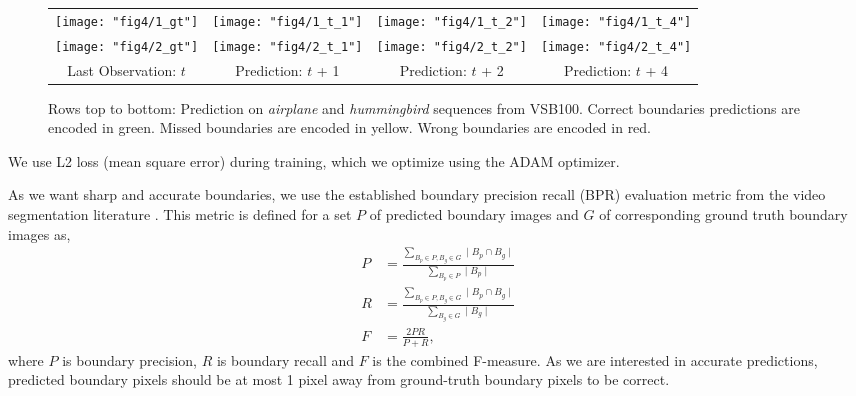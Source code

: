 \begin{figure*}[t]
  
  \centering
  \begin{tabular}{ cccc }
     
    \texttt{[image: "fig4/1\_gt"]} &
    \texttt{[image: "fig4/1\_t\_1"]} &
    \texttt{[image: "fig4/1\_t\_2"]} &
    \texttt{[image: "fig4/1\_t\_4"]} \\
     \addlinespace[-3.4ex]
    \texttt{[image: "fig4/2\_gt"]}&
    \texttt{[image: "fig4/2\_t\_1"]}&
    \texttt{[image: "fig4/2\_t\_2"]}&
    \texttt{[image: "fig4/2\_t\_4"]}\\
    
    Last Observation: $t$ & Prediction: $t$ + 1 & Prediction: $t$ + 2 &  Prediction: $t$ + 4 \\
    
    \end{tabular}
  \caption{Rows top to bottom: Prediction on \emph{airplane} and \emph{hummingbird} sequences from VSB100. Correct boundaries predictions are encoded in green. Missed boundaries are encoded in yellow. Wrong boundaries are encoded in red.}
  \label{fig:cframes}
\end{figure*}

 We use L2 loss (mean square error) during training, which we optimize using the ADAM optimizer. 

 As we want sharp and accurate boundaries, we use the established boundary precision recall (BPR) evaluation metric from the video segmentation literature \cite{galasso2013unified}. This metric is defined for a set $P$ of predicted boundary images and $G$ of corresponding ground truth boundary images as,
%
\begin{align*}
    P &= \frac{ \sum_{B_{p} \in P, B_{g} \in G} \mid B_{p} \cap B_{g} \mid }{\sum_{B_{p} \in P} \mid B_{p} \mid}\\
    R &= \frac{ \sum_{B_{p} \in P, B_{g} \in G} \mid B_{p} \cap B_{g} \mid }{\sum_{B_{g} \in G} \mid B_{g} \mid}\\
    F &= \frac{2 PR}{P + R},
\end{align*}
where $P$ is boundary precision, $R$ is boundary recall and $F$ is the combined F-measure. As we are interested in accurate predictions, predicted boundary pixels should be at most 1 pixel away from ground-truth boundary pixels to be correct.

